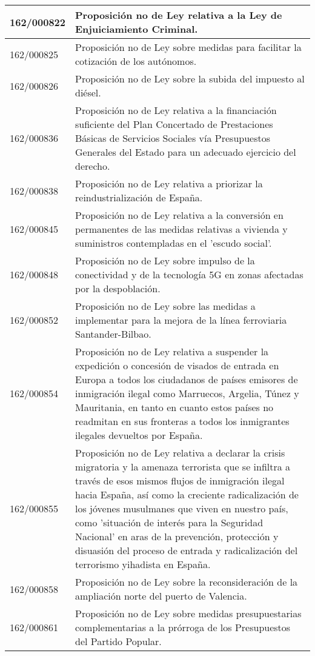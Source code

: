 {\begin{table}[H]
\begin{center}
\begin{tabularx}{\linewidth}{| l | X |}
\hline
162/000822 & Proposición no de Ley relativa a la Ley de Enjuiciamiento Criminal. \\
\hline
162/000825 & Proposición no de Ley sobre medidas para facilitar la cotización de los autónomos. \\
\hline
162/000826 & Proposición no de Ley sobre la subida del impuesto al diésel. \\
\hline
162/000836 & Proposición no de Ley relativa a la financiación suficiente del Plan Concertado de Prestaciones Básicas de Servicios Sociales vía Presupuestos Generales del Estado para un adecuado ejercicio del derecho. \\
\hline
162/000838 & Proposición no de Ley relativa a priorizar la reindustrialización de España. \\
\hline
162/000845 & Proposición no de Ley relativa a la conversión en permanentes de las medidas relativas a vivienda y suministros contempladas en el 'escudo social'. \\
\hline
162/000848 & Proposición no de Ley sobre impulso de la conectividad y de la tecnología 5G en zonas afectadas por la despoblación. \\
\hline
162/000852 & Proposición no de Ley sobre las medidas a implementar para la mejora de la línea ferroviaria Santander-Bilbao. \\
\hline
162/000854 & Proposición no de Ley relativa a suspender la expedición o concesión de visados de entrada en Europa a todos los ciudadanos de países emisores de inmigración ilegal como Marruecos, Argelia, Túnez y Mauritania, en tanto en cuanto estos países no readmitan en sus fronteras a todos los inmigrantes ilegales devueltos por España. \\
\hline
162/000855 & Proposición no de Ley relativa a declarar la crisis migratoria y la amenaza terrorista que se infiltra a través de esos mismos flujos de inmigración ilegal hacia España, así como la creciente radicalización de los jóvenes musulmanes que viven en nuestro país, como 'situación de interés para la Seguridad Nacional' en aras de la prevención, protección y disuasión del proceso de entrada y radicalización del terrorismo yihadista en España. \\
\hline
162/000858 & Proposición no de Ley sobre la reconsideración de la ampliación norte del puerto de Valencia. \\
\hline
162/000861 & Proposición no de Ley sobre medidas presupuestarias complementarias a la prórroga de los Presupuestos del Partido Popular. \\

\end{tabularx}
\end{center}
\end{table}}
